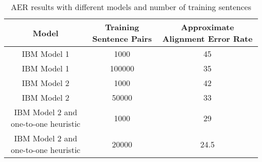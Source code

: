 \documentclass{article}
\begin{document}
\begin{table}[!h]
\caption{AER results with different models and number of training sentences}
\begin{center}

\begin{tabular}{|c|c|c|}
	\hline
	Model & Training Sentence Pairs & Approximate Alignment Error Rate \\
	\hline
	IBM Model 1 & 1000 & 45 \\
	\hline
	IBM Model 1 & 100000 & 35 \\
	\hline
	IBM Model 2 & 1000 & 42 \\
	\hline
	IBM Model 2 & 50000 & 33 \\
	\hline
	IBM Model 2 and one-to-one heuristic & 1000 & 29 \\
	\hline
	IBM Model 2 and one-to-one heuristic & 20000 & 24.5 \\
	\hline
\end{tabular}
\end{center}

\end{table}
	
\end{document}
